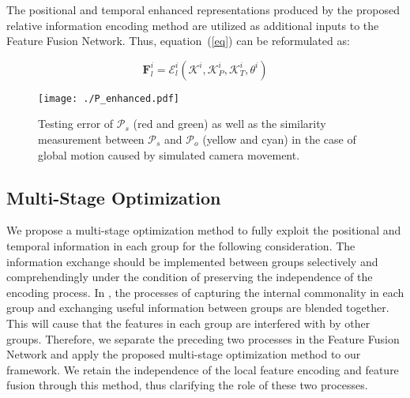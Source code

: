 \documentclass[sigconf]{acmart}
\begin{document}
The positional and temporal enhanced representations produced by the proposed relative information encoding method are utilized as additional inputs to the Feature Fusion Network. Thus, equation~(\ref{eq}) can be reformulated as:

\begin{equation}
\mathbf{F}_{l}^{i}={\mathcal{E}_{l}^{i}}(\mathcal{K}^{i},\mathcal{K}_{P}^{i},\mathcal{K}_{T}^{i}, \theta^{i})
\end{equation}

\begin{figure}
  \centering
  \texttt{[image: ./P\_enhanced.pdf]}
  \vspace{-0.5cm}
  \caption{Testing error of $\mathcal{P}_{s}$ (red and green) as well as the similarity measurement between $\mathcal{P}_{s}$ and $\mathcal{P}_{o}$ (yellow and cyan) in the case of global motion caused by simulated camera movement.}
  \vspace{-0.3cm}
  \label{img6}
\end{figure}


\subsection{Multi-Stage Optimization}\label{MS}
We propose a multi-stage optimization method to fully exploit the positional and temporal information in each group for the following consideration. The information exchange should be implemented between groups selectively and comprehendingly under the condition of preserving the independence of the encoding process. In \cite{zeng2020srnet}, the processes of capturing the internal commonality in each group and exchanging useful information between groups are blended together. This will cause that the features in each group are interfered with by other groups. Therefore, we separate the preceding two processes in the Feature Fusion Network and apply the proposed multi-stage optimization method to our framework. We retain the independence of the local feature encoding and feature fusion through this method, thus clarifying the role of these two processes. 
\end{document}
